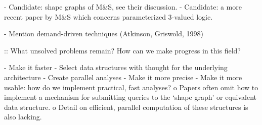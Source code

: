 \documentclass{article}
\begin{document}
- Candidate: shape graphs of M\&S, see their discussion.
- Candidate: a more recent paper by M\&S which concerns parameterized 3-valued
  logic.

- Mention demand-driven techniques (Atkinson, Griswold, 1998)

:: What unsolved problems remain? How can we make progress in this field?

- Make it faster
    - Select data structures with thought for the underlying architecture
    - Create parallel analyses
- Make it more precise
- Make it more usable: how do we implement practical, fast analyses?
	o Papers often omit how to implement a mechanism for submitting queries
	  to the `shape graph' or equivalent data structure.  
	o Detail on efficient, parallel computation of these structures is also
	  lacking.
\end{document}
